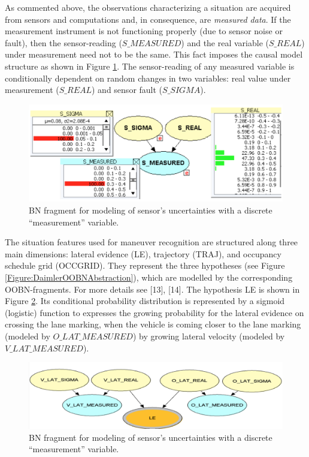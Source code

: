 As commented above, the observations characterizing a situation are acquired from sensors and computations and, in consequence, are \textit{measured data}. If the measurement instrument is not functioning properly (due to sensor noise or fault), then the sensor-reading ($S\_MEASURED$) and the real variable ($S\_REAL$) under measurement need not to be the same. This fact imposes the causal model structure as shown in Figure \ref{Figure:DaimlerSensorModelling}. The sensor-reading of any measured variable is conditionally dependent on random changes in two variables: real value under measurement ($S\_REAL$) and sensor fault ($S\_SIGMA$).

\begin{figure}
\begin{center}
\includegraphics[scale=0.35]{./figures/DaimlerSensorModelling}
\caption{\label{Figure:DaimlerSensorModelling} BN fragment for modeling of sensor’s uncertainties with a discrete ``measurement'' variable.}
\end{center}
\end{figure}


The situation features used for maneuver recognition are structured along three main dimensions: lateral evidence (LE), trajectory (TRAJ), and occupancy schedule grid (OCCGRID). They represent the three hypotheses (see Figure \ref{Figure:DaimlerOOBNAbstraction}), which are modelled by the corresponding OOBN-fragments. For more details see [13], [14]. The hypothesis LE is shown in Figure \ref{Figure:DaimlerLE}. Its conditional probability distribution is represented by a sigmoid (logistic) function to expresses the growing probability for the lateral evidence on crossing the lane marking, when the vehicle is coming closer to the lane marking (modeled by $O\_LAT\_MEASURED$) by growing lateral velocity (modeled by $V\_LAT\_ MEASURED$).

\begin{figure}
\begin{center}
\includegraphics[scale=0.35]{./figures/DaimlerLE}
\caption{\label{Figure:DaimlerLE} BN fragment for modeling of sensor’s uncertainties with a discrete ``measurement'' variable.}
\end{center}
\end{figure}

